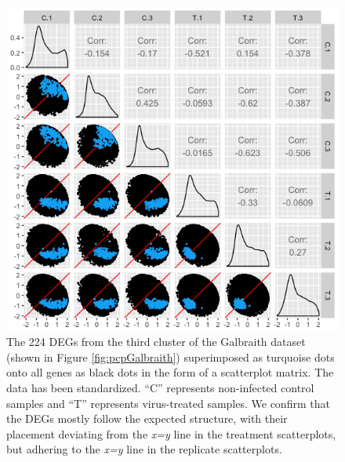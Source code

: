 \documentclass[11pt,a4paper,oldfontcommands,openany]{memoir}
\numberwithin{equation}{section} %
\begin{document}
\begin{figure}[H]
\begin{framed}
  \includegraphics[width=\textwidth]{Images/GalbraithClust3SM}
\end{framed}
  \caption{The 224 DEGs from the third cluster of the Galbraith dataset (shown in Figure \ref{fig:pcpGalbraith}) superimposed as turquoise dots onto all genes as black dots in the form of a scatterplot matrix. The data has been standardized. ``C'' represents non-infected control samples and ``T'' represents virus-treated samples. We confirm that the DEGs mostly follow the expected structure, with their placement deviating from the \textit{x=y} line in the treatment scatterplots, but adhering to the \textit{x=y} line in the replicate scatterplots.}
  \label{fig:GalbraithClust3SM}
\end{figure}
\end{document}
